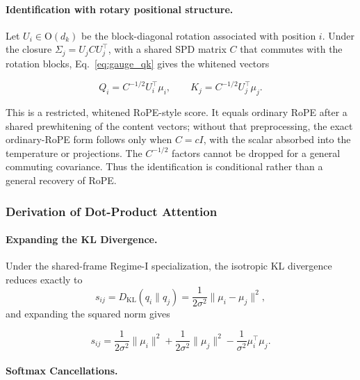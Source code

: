 \documentclass[twoside,11pt]{article}
\begin{document}
\paragraph{Identification with rotary positional structure.}
Let $U_i\in\mathrm{O}(d_k)$ be the block-diagonal rotation associated with position $i$. Under the closure $\Sigma_j=U_jCU_j^\top$, with a shared SPD matrix $C$ that commutes with the rotation blocks, Eq.~\eqref{eq:gauge_qk} gives the whitened vectors

\begin{equation}
Q_i=C^{-1/2}U_i^\top\mu_i,
\qquad
K_j=C^{-1/2}U_j^\top\mu_j.
\label{eq:whitened_rope_carving}
\end{equation}

This is a restricted, whitened RoPE-style score. It equals ordinary RoPE after a shared prewhitening of the content vectors; without that preprocessing, the exact ordinary-RoPE form follows only when $C=cI$, with the scalar absorbed into the temperature or projections. The $C^{-1/2}$ factors cannot be dropped for a general commuting covariance. Thus the identification is conditional rather than a general recovery of RoPE.

\subsubsection{Derivation of Dot-Product Attention}
\label{sec:dot_product_derivation}

\paragraph{Expanding the KL Divergence.}

Under the shared-frame Regime-I specialization, the isotropic KL divergence reduces exactly to
\begin{equation}
s_{ij} = D_{\mathrm{KL}}(q_i \| q_j) = \frac{1}{2\sigma^2}\|\mu_i - \mu_j\|^2,
\end{equation}
and expanding the squared norm gives


\begin{equation}
s_{ij} = \frac{1}{2\sigma^2}\|\mu_i\|^2 + \frac{1}{2\sigma^2}\|\mu_j\|^2 - \frac{1}{\sigma^2}\mu_i^\top\mu_j.
\end{equation}

\paragraph{Softmax Cancellations.}
\end{document}
